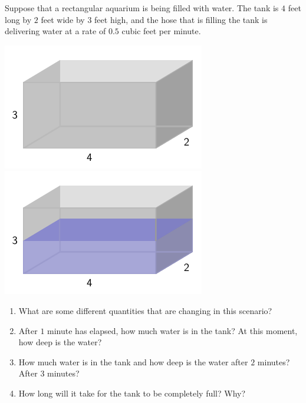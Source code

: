\documentclass{ximera}
\begin{document}
\begin{exploration}
Suppose that a rectangular aquarium is being filled with water.  The tank is \(4\) feet long by \(2\) feet wide by \(3\) feet high, and the hose that is filling the tank is delivering water at a rate of \(0.5\) cubic feet per minute.

\begin{image}
\includegraphics{tandem-empty-aquarium}
\includegraphics{tandem-filled-aquarium}
\end{image}

\begin{enumerate}[label=\alph*.]
\item What are some different quantities that are changing in this scenario?%
\item After \(1\) minute has elapsed, how much water is in the tank?  At this moment, how deep is the water?%
\item How much water is in the tank and how deep is the water after \(2\) minutes?  After \(3\) minutes?%
\item How long will it take for the tank to be completely full?  Why?%
\end{enumerate}
\end{exploration}


\end{document}
